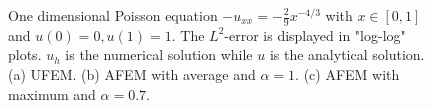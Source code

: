 \begin{figure}[!t]
  \centering
  \hfill
  \hfill
  \caption{One dimensional Poisson equation $-u_{xx} = -\frac{2}{9}x^{-4/3}$ with $x \in [0,1]$ and $u(0) = 0,  u(1) = 1$. The $L^2$-error is displayed in "log-log" plots. $u_h$ is the numerical solution while $u$ is the analytical solution. (a) UFEM. (b) AFEM with average and $\alpha = 1$. (c) AFEM with maximum and $\alpha = 0.7$.}
  \label{fig:5e}
\end{figure}
\newpage
\ 
\newpage

